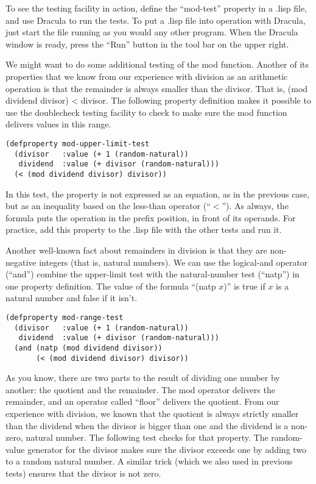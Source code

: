 To see the testing facility in action, define the ``mod-test'' property in a .lisp file, and use Dracula to run the tests. To put a .lisp file into operation with Dracula, just start the file running as you would any other program. When the Dracula window is ready, press the ``Run'' button in the tool bar on the upper right.

We might want to do some additional testing of the mod function. Another of its properties that we know from our experience with division as an arithmetic operation is that the remainder is always smaller than the divisor. That is, (mod dividend divisor) < divisor. The following property definition makes it possible to use the doublecheck testing facility to check to make sure the mod function delivers values in this range.

\begin{lstlisting}
(defproperty mod-upper-limit-test
  (divisor   :value (+ 1 (random-natural))
   dividend  :value (+ divisor (random-natural)))
  (< (mod dividend divisor) divisor))
\end{lstlisting}

In this test, the property is not expressed as an equation, as in the previous case, but as an inequality based on the less-than operator (``$<$''). As always, the formula puts the operation in the prefix position, in front of its operands. For practice, add this property to the .lisp file with the other tests and run it.

Another well-known fact about remainders in division is that 
they are non-negative integers (that is, natural numbers). 
We can use the logical-and operator (``and'') combine 
the upper-limit test with the natural-number test (``natp'') in one property definition.
\label{natp-op}
The value of the formula ``(natp $x$)'' is true 
if $x$ is a natural number and false if it isn't.

\begin{lstlisting}
(defproperty mod-range-test
  (divisor   :value (+ 1 (random-natural))
   dividend  :value (+ divisor (random-natural)))
  (and (natp (mod dividend divisor))
       (< (mod dividend divisor) divisor))
\end{lstlisting}

As you know, there are two parts to the result of dividing one number by another: the quotient and the remainder. The mod operator delivers the remainder, and an operator called ``floor'' delivers the quotient. From our experience with division, we known that the quotient is always strictly smaller than the dividend when the divisor is bigger than one and the dividend is a non-zero, natural number. The following test checks for that property. The random-value generator for the divisor makes sure the divisor exceeds one by adding two to a random natural number. A similar trick (which we also used in previous tests) ensures that the divisor is not zero.

